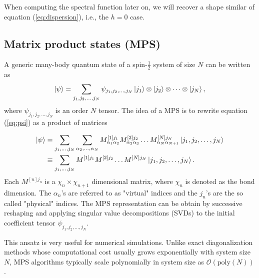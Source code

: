 When computing the spectral function later on, we will recover a shape similar of equation (\ref{eq:dispersion}), i.e., the $h=0$ case.

\subsection{Matrix product states (MPS)}
A generic many-body quantum state of a spin-$\frac{1}{2}$ system of size $N$ can be written as 
\begin{equation}
    \label{eq:psi}
    \ket{\psi} = \sum_{j_1, j_2, \dots, j_N} \psi_{j_1, j_2, \dots, j_N} \ket{j_1} \otimes \ket{j_2} \otimes \dots \otimes \ket{j_N},
\end{equation}
where $\psi_{j_1, j_2, \dots, j_N}$ is an order $N$ tensor. The idea of a MPS is to rewrite equation (\ref{eq:psi}) as a product of matrices

\begin{align}
    \ket{\psi} &= \sum_{j_1, \dots, j_N} \sum_{\alpha_2, \dots, \alpha_N} M^{[1]j_1}_{\alpha_1 \alpha_2} M^{[2]j_2}_{\alpha_2 \alpha_3} \dots M^{[N]j_N}_{\alpha_N \alpha_{N+1}} \ket{j_1, j_2, \dots, j_N} \notag \\
    &\equiv \sum_{j_1, \dots, j_N} M^{[1]j_1} M^{[2]j_2} \dots M^{[N]j_N} \ket{j_1, j_2, \dots, j_N}.
\end{align}
Each $M^{[n]j_n}$ is a $\chi_n \times \chi_{n+1}$ dimensional matrix, where $\chi_n$ is denoted as the bond dimension. 
The $\alpha_n$'s are referred to as "virtual" indices and the $j_n$'s are the so called "physical" indices.
The MPS representation can be obtain by successive reshaping and applying singular value decompositions (SVDs) to the initial coefficient tensor $\psi_{j_1, j_2, \dots, j_N}$.\cite{Hauschild2018}

This ansatz is very useful for numerical simulations. Unlike exact diagonalization methods whose computational cost usually grows exponentially with system size $N$, 
MPS algorithms typically scale polynomially in system size as $\mathcal{O}(\text{poly}(N))$.


